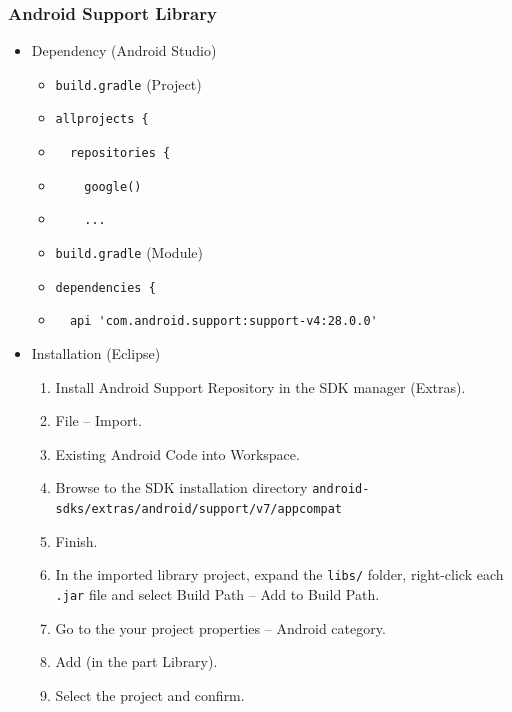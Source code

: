 \documentclass[10pt,xcolor=pdflatex]{beamer}
\begin{document}
\begin{frame}[fragile]\frametitle{Android Support Library}
	\begin{itemize}
      \item Dependency (Android Studio)
        \begin{itemize}
          \item \texttt{build.gradle} {\footnotesize (Project)}
          \item[] \verb+allprojects {+
          \item[] \verb+  repositories {+
          \item[] \verb+    google()+
          \item[] \verb+    ...+
          \item \texttt{build.gradle} {\footnotesize (Module)}
          \item[] \verb+dependencies {+
          \item[] \verb+  api 'com.android.support:support-v4:28.0.0'+
        \end{itemize}
      \item Installation (Eclipse)
        \begin{enumerate}
          \item {\footnotesize Install Android Support Repository in the SDK manager (Extras).}
          \item {\footnotesize File -- Import.}
          \item {\footnotesize Existing Android Code into Workspace.}
          \item {\footnotesize Browse to the SDK installation directory \texttt{android-sdks/extras/android/support/v7/appcompat}}
          \item {\footnotesize Finish.}
          \item {\footnotesize In the imported library project, expand the \texttt{libs/} folder, right-click each \texttt{.jar} file and select Build Path -- Add to Build Path.}
          \item {\footnotesize Go to the your project properties -- Android category.}
          \item {\footnotesize Add (in the part Library).}
          \item {\footnotesize Select the project and confirm.}
        \end{enumerate}
    \end{itemize}
\end{frame}
\end{document}
